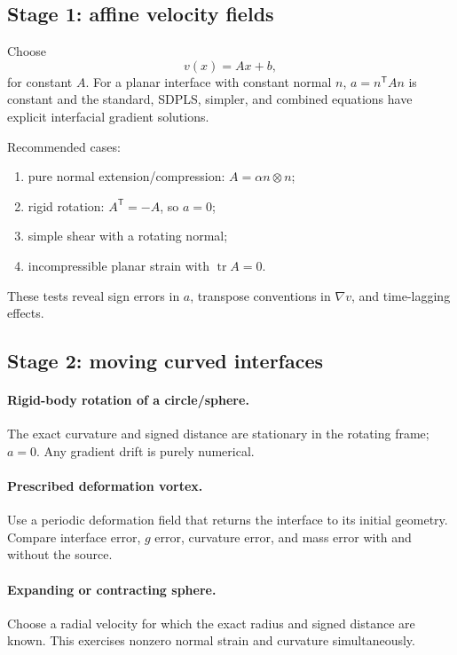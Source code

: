 \documentclass[11pt,a4paper]{article}
\theoremstyle{definition}
\theoremstyle{remark}
\newcommand{\tr}{\operatorname{tr}}
\begin{document}
\subsection{Stage 1: affine velocity fields}

Choose
\begin{equation}
  v(x)=Ax+b,
\end{equation}
for constant $A$. For a planar interface with constant normal $n$, $a=n^{\mathsf T}An$ is constant and the standard, SDPLS, simpler, and combined equations have explicit interfacial gradient solutions.

Recommended cases:
\begin{enumerate}
  \item pure normal extension/compression: $A=\alpha n\otimes n$;
  \item rigid rotation: $A^{\mathsf T}=-A$, so $a=0$;
  \item simple shear with a rotating normal;
  \item incompressible planar strain with $\tr A=0$.
\end{enumerate}
These tests reveal sign errors in $a$, transpose conventions in $\nabla v$, and time-lagging effects.

\subsection{Stage 2: moving curved interfaces}

\paragraph{Rigid-body rotation of a circle/sphere.}
The exact curvature and signed distance are stationary in the rotating frame; $a=0$. Any gradient drift is purely numerical.

\paragraph{Prescribed deformation vortex.}
Use a periodic deformation field that returns the interface to its initial geometry. Compare interface error, $g$ error, curvature error, and mass error with and without the source.

\paragraph{Expanding or contracting sphere.}
Choose a radial velocity for which the exact radius and signed distance are known. This exercises nonzero normal strain and curvature simultaneously.
\end{document}
